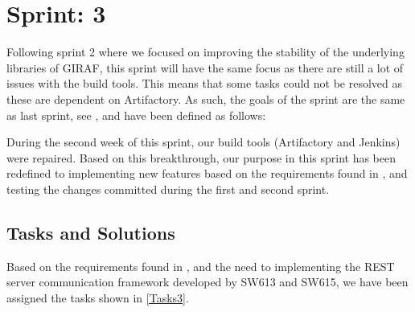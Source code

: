 \chapter{Sprint: 3}
Following sprint 2 where we focused on improving the stability of the underlying
libraries of GIRAF, this sprint will have the same focus as there are still a
lot of issues with the build tools. This means that some tasks could not be
resolved as these are dependent on Artifactory. As such, the goals of the sprint
are the same as last sprint, see \label{Sprint2UserStories}, and have been
defined as follows:\nl

\nl

\nl

\nl

During the second week of this sprint, our build tools (Artifactory and
Jenkins) were repaired. Based on this breakthrough, our purpose in this sprint
has been redefined to implementing new features based on the requirements found
in \label{sec:Colab2}, and testing the changes committed during the first and
second sprint. 

\section{Tasks and Solutions}
Based on the requirements found in \label{sec:Colab2}, and the need to
implementing the REST server communication framework developed by SW613 and
SW615, we have been assigned the tasks shown in \autoref{Tasks3}.

